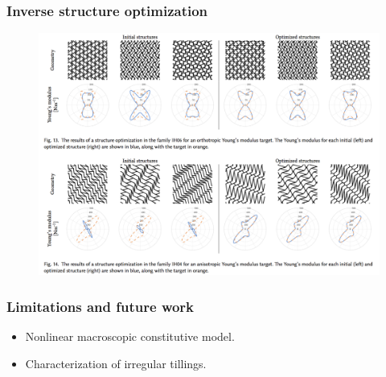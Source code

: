 \documentclass[serif,mathserif, 12pt]{beamer}
\begin{document}
\begin{frame}
  \frametitle{Inverse structure optimization}
  \begin{figure}
    \centering
    \includegraphics[width=\textwidth]{img/inv_opt}
  \end{figure}
\end{frame}

\begin{frame}
  \frametitle{Limitations and future work}
  \begin{itemize}
  \item Nonlinear macroscopic constitutive model.
  \item Characterization of irregular tillings.
  \end{itemize}
\end{frame}

\begin{frame} 
\end{frame}
\end{document}

